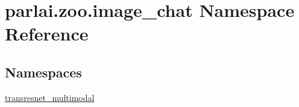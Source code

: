 \hypertarget{namespaceparlai_1_1zoo_1_1image__chat}{}\section{parlai.\+zoo.\+image\+\_\+chat Namespace Reference}
\label{namespaceparlai_1_1zoo_1_1image__chat}
\subsection*{Namespaces}
\begin{DoxyCompactItemize}
\item 
 \hyperlink{namespaceparlai_1_1zoo_1_1image__chat_1_1transresnet__multimodal}{transresnet\+\_\+multimodal}
\end{DoxyCompactItemize}
